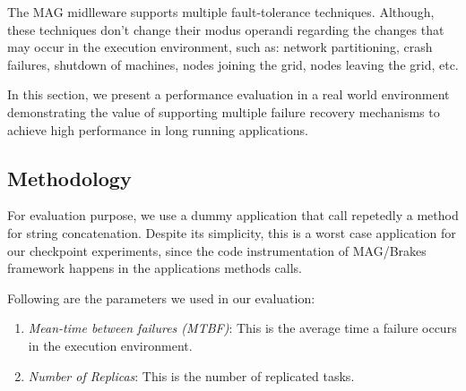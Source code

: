 \documentclass[times, 10pt, twocolumn]{article}
\begin{document}

The MAG midlleware supports multiple fault-tolerance techniques. Although,
these techniques don't change their modus operandi regarding the changes that
may occur in the execution environment, such as: network partitioning, crash
failures, shutdown of machines, nodes joining the grid, nodes leaving the grid,
etc. 

 

In this
section, we present a performance
evaluation in a real world environment demonstrating the value of supporting
multiple failure recovery mechanisms to achieve high performance in long
running applications.

\subsection{Methodology}

For evaluation purpose, we use a dummy application that call repetedly a
method for string concatenation. Despite its simplicity, this is a worst case
application for our checkpoint experiments, since the code instrumentation of
MAG/Brakes framework happens in the applications methods calls.

Following are the parameters we used in our evaluation:

\begin{enumerate}
   
    \item \emph{Mean-time between failures (MTBF)}: This is the average time a
failure occurs in the execution environment.
 
    \item \emph{Number of Replicas}: This is the number of replicated
tasks.   
\end{enumerate}
\end{document}
